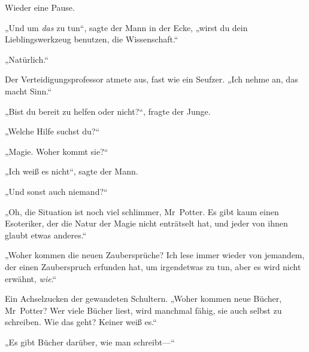 Wieder eine Pause.

„Und um \emph{das} zu tun“, sagte der Mann in der Ecke, „wirst du dein Lieblingswerkzeug benutzen, die Wissenschaft.“

„Natürlich.“

Der Verteidigungsprofessor atmete aus, fast wie ein Seufzer.
„Ich nehme an, das macht Sinn.“

„Bist du bereit zu helfen oder nicht?“, fragte der Junge.

„Welche Hilfe suchst du?“

„Magie. Woher kommt sie?“

„Ich weiß es nicht“, sagte der Mann.

„Und sonst auch niemand?“

„Oh, die Situation ist noch viel schlimmer, Mr~Potter. Es gibt kaum einen Esoteriker, der die Natur der Magie nicht enträtselt hat, und jeder von ihnen glaubt etwas anderes.“

„Woher kommen die neuen Zaubersprüche? Ich lese immer wieder von jemandem, der einen Zauberspruch erfunden hat, um irgendetwas zu tun, aber es wird nicht erwähnt, \emph{wie}.“

Ein Achselzucken der gewandeten Schultern.
„Woher kommen neue Bücher, Mr~Potter? Wer viele Bücher liest, wird manchmal fähig, sie auch selbst zu schreiben. Wie das geht? Keiner weiß es.“

„Es gibt Bücher darüber, wie man schreibt—“

